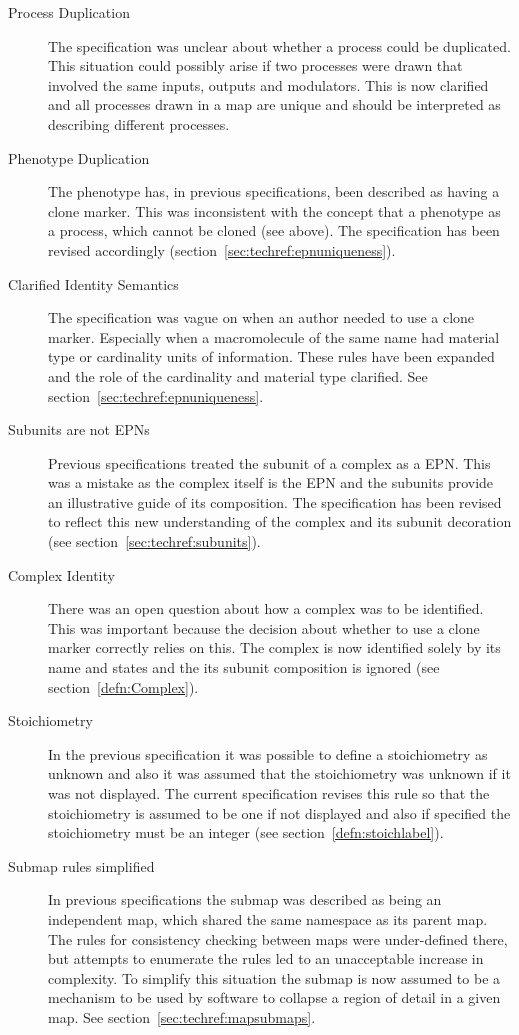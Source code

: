\begin{description}
\item[Process Duplication] The specification was unclear about whether a process could be duplicated. This situation could possibly arise if two processes were drawn that involved the same inputs, outputs and modulators. This is now clarified and all processes drawn in a map are unique and should be interpreted as describing different processes.
\item[Phenotype Duplication] The phenotype has, in previous specifications, been described as having a clone marker. This was inconsistent with the concept that a phenotype as a process, which cannot be cloned (see above). The specification has been revised accordingly (section~\ref{sec:techref:epnuniqueness}).
\item[Clarified Identity Semantics] The specification was vague on when an author needed to use a clone marker. Especially when a macromolecule of the same name had material type or cardinality units of information. These rules have been expanded and the role of the cardinality and material type clarified. See section~\ref{sec:techref:epnuniqueness}.
\item[Subunits are not EPNs] Previous specifications treated the subunit of a complex as a EPN. This was a mistake as the complex itself is the EPN and the subunits provide an illustrative guide of its composition. The specification has been revised to reflect this new understanding of the complex and its subunit decoration (see section~\ref{sec:techref:subunits}).
\item[Complex Identity] There was an open question about how a complex was to be identified. This was important because the decision about whether to use a clone marker correctly relies on this. The complex is now identified solely by its name and states and the its subunit composition is ignored (see section~\ref{defn:Complex}).
\item[Stoichiometry] In the previous specification it was possible to define a stoichiometry as unknown and also it was assumed that the stoichiometry was unknown if it was not displayed. The current specification revises this rule so that the stoichiometry is assumed to be one if not displayed and also if specified the stoichiometry must be an integer (see section~\ref{defn:stoichlabel}).
\item[Submap rules simplified] In previous specifications the submap was described as being an independent map, which shared the same namespace as its parent map. The rules for consistency checking between maps were under-defined there, but attempts to enumerate the rules led to an unacceptable increase in complexity. To simplify this situation the submap is now assumed to be a mechanism to be used by software to collapse a region of detail in a given map.  See section~\ref{sec:techref:mapsubmaps}.
\end{description}
